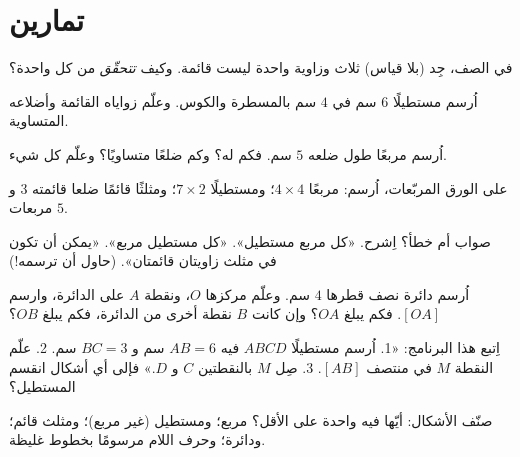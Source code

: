 \section{تمارين}

\begin{exercise}[$\star$]\label{exo:g3:shapes:1}
في الصف، جِد (بلا قياس) ثلاث  وزاوية واحدة
ليست قائمة. وكيف \emph{تتحقّق} من كل واحدة؟
\end{exercise}

\begin{exercise}[$\star$]\label{exo:g3:shapes:2}
اُرسم مستطيلًا $6$ سم في $4$ سم بالمسطرة والكوس. وعلّم
زواياه القائمة وأضلاعه المتساوية.
\end{exercise}

\begin{exercise}[$\star$]\label{exo:g3:shapes:3}
اُرسم مربعًا طول ضلعه $5$ سم. فكم  له؟
وكم ضلعًا متساويًا؟ وعلّم كل شيء.
\end{exercise}

\begin{exercise}[$\star$]\label{exo:g3:shapes:4}
على الورق المربّعات، اُرسم: مربعًا $4 \times 4$؛ ومستطيلًا
$7 \times 2$؛ ومثلثًا قائمًا ضلعا قائمته $3$ و $5$ مربعات.
\end{exercise}

\begin{exercise}[$\star$]\label{exo:g3:shapes:5}
صواب أم خطأ؟ اِشرح.
«كل مربع مستطيل». \quad
«كل مستطيل مربع». \quad
«يمكن أن تكون في مثلث زاويتان قائمتان». (حاول أن ترسمه!)
\end{exercise}

\begin{exercise}[$\star$]\label{exo:g3:shapes:6}
اُرسم دائرة نصف قطرها $4$ سم. وعلّم مركزها $O$، ونقطة $A$
على الدائرة، وارسم  $[OA]$. فكم يبلغ $OA$؟ وإن كانت $B$
نقطة أخرى من الدائرة، فكم يبلغ $OB$؟
\end{exercise}

\begin{exercise}[$\star$]\label{exo:g3:shapes:7}
اِتبع هذا البرنامج: «1. اُرسم مستطيلًا $ABCD$ فيه $AB = 6$ سم
و $BC = 3$ سم. 2. علّم النقطة $M$ في منتصف $[AB]$.
3. صِل $M$ بالنقطتين $C$ و $D$.» فإلى أي أشكال انقسم
المستطيل؟
\end{exercise}

\begin{exercise}[$\star$]\label{exo:g3:shapes:8}
صنّف الأشكال: أيّها فيه  واحدة على الأقل؟
مربع؛ ومستطيل (غير مربع)؛ ومثلث قائم؛ ودائرة؛ وحرف
اللام مرسومًا بخطوط غليظة.
\end{exercise}

